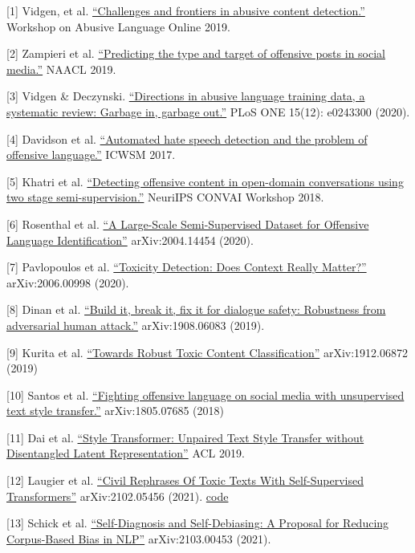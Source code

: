 {[}1{]} Vidgen, et al. \href{https://www.aclweb.org/anthology/W19-3509/}{``Challenges and frontiers in abusive content detection.''} Workshop on Abusive Language Online 2019.

{[}2{]} Zampieri et al. \href{https://arxiv.org/abs/1902.09666}{``Predicting the type and target of offensive posts in social media.''} NAACL 2019.

{[}3{]} Vidgen \& Deczynski. \href{https://arxiv.org/abs/2004.01670}{``Directions in abusive language training data, a systematic review: Garbage in, garbage out.''} PLoS ONE 15(12): e0243300 (2020).

{[}4{]} Davidson et al. \href{https://arxiv.org/abs/1703.04009}{``Automated hate speech detection and the problem of offensive language.''} ICWSM 2017.

{[}5{]} Khatri et al. \href{https://arxiv.org/abs/1811.12900}{``Detecting offensive content in open-domain conversations using two stage semi-supervision.''} NeuriIPS CONVAI Workshop 2018.

{[}6{]} Rosenthal et al. \href{https://arxiv.org/abs/2004.14454}{``A Large-Scale Semi-Supervised Dataset for Offensive Language Identification''} arXiv:2004.14454 (2020).

{[}7{]} Pavlopoulos et al. \href{https://arxiv.org/abs/2006.00998}{``Toxicity Detection: Does Context Really Matter?''} arXiv:2006.00998 (2020).

{[}8{]} Dinan et al. \href{https://arxiv.org/abs/1908.06083}{``Build it, break it, fix it for dialogue safety: Robustness from adversarial human attack.''} arXiv:1908.06083 (2019).

{[}9{]} Kurita et al. \href{https://arxiv.org/abs/1912.06872}{``Towards Robust Toxic Content Classification''} arXiv:1912.06872 (2019)

{[}10{]} Santos et al. \href{https://arxiv.org/abs/1805.07685}{``Fighting offensive language on social media with unsupervised text style transfer.''} arXiv:1805.07685 (2018)

{[}11{]} Dai et al. \href{https://arxiv.org/abs/1905.05621}{``Style Transformer: Unpaired Text Style Transfer without Disentangled Latent Representation''} ACL 2019.

{[}12{]} Laugier et al. \href{https://arxiv.org/abs/2102.05456}{``Civil Rephrases Of Toxic Texts With Self-Supervised Transformers''} arXiv:2102.05456 (2021). \href{https://github.com/LeoLaugier/conditional-auto-encoder-text-to-text-transfer-transformer}{code}

{[}13{]} Schick et al. \href{https://arxiv.org/abs/2103.00453}{``Self-Diagnosis and Self-Debiasing: A Proposal for Reducing Corpus-Based Bias in NLP''} arXiv:2103.00453 (2021).

